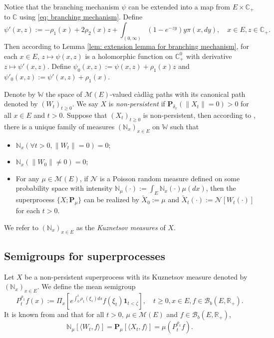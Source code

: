\documentclass[12pt,a4paper]{amsart}
\theoremstyle{plain}
\theoremstyle{definition}
\numberwithin{equation}{section}
\begin{document}
    Notice that the branching mechanism $\psi$ can be extended into a map from $E \times \mathbb C_+$ to $\mathbb C$ using \eqref{eq: branching mechanism}.
    Define
\begin{equation}
    \psi'(x,z):= - \rho_1(x) + 2\rho_2(x) z + \int_{(0,\infty)} (1-e^{-zy})y\pi(x,dy),
    \quad x\in E, z\in \mathbb C_+.
\end{equation}
    Then according to Lemma \ref{lem: extension lemma for branching mechanism}, for each $x \in E$, $z \mapsto \psi(x,z)$ is a holomorphic function on $\mathbb C_+^0$ with derivative $z \mapsto \psi'(x,z)$.
    Define $\psi_0(x,z) := \psi(x,z)+ \rho_1(x)z $ and $\psi'_0(x,z) := \psi'(x,z) + \rho_1(x)$.

    Denote by $\mathbb W$ the space of $\mathcal M(E)$-valued c\`{a}dl\`{a}g paths with its canonical path denoted by $(W_t)_{t\geq 0}$.
    We say $X$ is \emph{non-persistent} if $\mathbf P_{\delta_x}(\|X_t\|= 0) > 0$ for all $x\in E$ and $t> 0$.
    Suppose that $(X_t)_{t\geq 0}$ is non-persistent, then according to \cite[Section 8.4]{Li2011Measure-valued},
    there is a unique family of measures $(\mathbb N_x)_{x\in E}$ on $\mathbb W$ such that
\begin{itemize}
\item
    $\mathbb N_x (\forall t > 0, \|W_t\|=0) =0$;
\item
    $\mathbb N_x(\|W_0 \|\neq 0) = 0$;
\item
    For any $\mu \in \mathcal M(E)$, if $\mathcal N$ is a Poisson random measure defined on some probability space
    with intensity $\mathbb N_\mu(\cdot):= \int_E \mathbb N_x(\cdot )\mu(dx)$,
    then the superprocess $\{X;\mathbf P_\mu\}$ can be realized by $\widetilde X_0 := \mu$ and $\widetilde X_t(\cdot) := \mathcal N[W_t(\cdot)]$ for each $t>0$.
\end{itemize}
    We refer to $(\mathbb N_x)_{x\in E}$ as the \emph{Kuznetsov measures} of $X$.
\subsection{{Semigroups for superprocesses}}
\label{sec: definition of vf}
    Let $X$ be a non-persistent superprocess with its Kuznetsov measure denoted by $(\mathbb N_x)_{x\in E}$.
    We define the mean semigroup
\begin{equation}
    P_t^{\rho_1} f(x)
    := \Pi_{x}[e^{\int_0^t \rho_1(\xi_s)ds}f(\xi_t) \mathbf 1_{t< \zeta}],
    \quad t\geq 0, x\in E, f\in \mathcal B_b(E,\mathbb R_+).
\end{equation}
    It is known from \cite[Proposition 2.27]{Li2011Measure-valued} and \cite[Theorem 2.7]{Kyprianou2014Fluctuations} that for all $t > 0$, $\mu \in \mathcal M(E)$ and $f\in \mathcal B_b(E,\mathbb R_+)$,
\begin{equation}
\label{eq: mean formula for superprocesses}
   \mathbb N_{\mu}[\langle W_t, f\rangle]    
   =\mathbf P_{\mu}[\langle X_t, f\rangle]
   =\mu(P^{\rho_1}_t f).
\end{equation}
\end{document}
